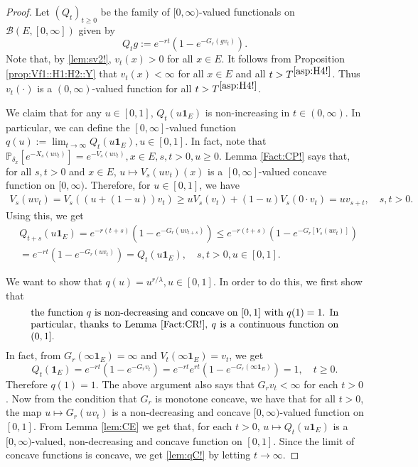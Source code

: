 \documentclass[12pt,a4paper]{amsart}
\numberwithin{equation}{section}
\theoremstyle{plain}
\theoremstyle{definition}
\theoremstyle{remark}
\begin{document}
\begin{proof}
	Let $(Q_t)_{t\geq 0}$ be the family of $[0,\infty)$-valued functionals on $\mathcal B(E,[0,\infty])$ given by
\[
	Q_tg
	:= e^{- r t}( 1 - e^{-G_r(gv_t)} ).
\]
	Note that, by \eqref{lem:sv2!}, $v_t(x)>0$ for all $x\in E$.
	It follows  from Proposition \ref{prop:Vf1::H1:H2::Y} that $v_t(x)<\infty$ for all $x\in E$ and all $t> T^{\eqref{asp:H4!}}$.
	Thus $v_t(\cdot)$ is a $(0,\infty)$-valued function for all $t> T^{\eqref{asp:H4!}}$.

	We claim that for any $u \in [0,1]$, %
	$Q_t(u \mathbf 1_E)$ is non-increasing in $t\in (0,\infty)$.
	In particular, we can define the $[0,\infty]$-valued function %
	$q(u):= \lim_{t\to \infty} Q_t(u \mathbf 1_E), u\in [0,1]$.
	In fact, note that $\mathbb P_{\delta_x}[e^{- X_s(uv_t)}] = e^{-V_s(uv_t)},x\in E, s,t>0, u \geq 0$.
	Lemma \ref{Fact:CP!} says that, for all $s,t > 0$ and $x\in E$, $u\mapsto V_s(uv_t)(x) $ is a $[0,\infty]$-valued concave function on $[0,\infty)$.
	Therefore, for $u\in [0,1]$, we have
\begin{align}
	V_s(uv_t)
	=V_s((u+ (1-u))v_t)
	\geq uV_s(v_t) + (1-u) V_s(0\cdot v_t)
	= uv_{s+t},
	\quad s,t > 0.
\end{align}
	Using this, we get
\begin{align}
	& Q_{t+s}(u \mathbf 1_E)
	= e^{- r (t+s)} ( 1-e^{-G_r(uv_{t+s})} )
	\leq e^{- r(t+s)}( 1-e^{-G_r[V_s(uv_t)]} ) \\
	& = e^{-r t}( 1-e^{-G_r(uv_t)} )
	= Q_t(u \mathbf 1_E),
	\quad s,t > 0, u \in [0,1].
\end{align}

	We want to show that $q(u)= u^{r/\lambda}, u\in [0,1]$.
	In order to do this, we first show that
\begin{equation} \label{lem:qC!}
\begin{minipage}{0.9\textwidth}
	the function $q$ is non-decreasing and concave on $[0,1]$ with $q(1) = 1$.
	In particular, thanks to Lemma \ref{Fact:CR!}, $q$ is a continuous function on $(0,1]$.
\end{minipage}
\end{equation}
	In fact, from $G_r(\infty \mathbf 1_E) = \infty$ and $V_t(\infty \mathbf 1_E) = v_t$, we get
	\[
	Q_t( \mathbf 1_E)
	= e^{- r t} ( 1-e^{-G_r v_t} )
	= e^{- r t} e^{r t}( 1-e^{-G_r (\infty \mathbf 1_E)} )
	= 1,
	\quad t\geq 0.
	\]
	Therefore $q(1) = 1$.
	The above argument also says that $G_r v_t < \infty$ for each $t>0$.
	Now from the condition that $G_r$ is monotone concave, we have that for all $t>0$, the map $u \mapsto G_r(uv_t)$ is a non-decreasing and concave $[0,\infty)$-valued function on $[0,1]$.
	From Lemma \ref{lem:CE} we get that, for each $t> 0$, $u \mapsto Q_t(u \mathbf 1_E)$ is a $[0,\infty)$-valued, non-decreasing and concave function on $[0,1]$.
	Since the limit of concave functions is concave, we get \eqref{lem:qC!} by letting $t\to \infty$.


\end{proof}
\end{document}
